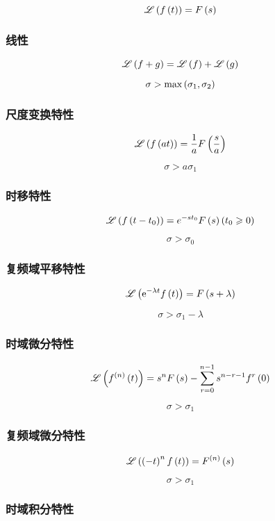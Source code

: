 \documentclass{article}
\begin{document}
\[\mathscr L\left(f\left(t\right)\right)=F\left(s\right)\]

\subsubsection{线性}

\[\mathscr L\left(f+g\right)=\mathscr L\left(f\right)+\mathscr L\left(g\right)\]

\[\sigma>\max\left(\sigma_1,\sigma_2\right)\]

\subsubsection{尺度变换特性}

\[\mathscr L\left(f\left(at\right)\right)=\frac1aF\left(\frac sa\right)\]

\[\sigma>a\sigma_1\]

\subsubsection{时移特性}

\[\mathscr L\left(f\left(t-t_0\right)\right)=e^{-st_0}F\left(s\right)\left(t_0\geqslant0\right)\]

\[\sigma>\sigma_0\]

\subsubsection{复频域平移特性}

\[\mathscr L\left(\mathrm e^{-\lambda t}f\left(t\right)\right)=F\left(s+\lambda\right)\]

\[\sigma>\sigma_1-\lambda\]

\subsubsection{时域微分特性}

\[\mathscr L\left(f^{\left(n\right)}\left(t\right)\right)=s^nF\left(s\right)-\sum_{r=0}^{n-1}s^{n-r-1}f^r\left(0\right)\]

\[\sigma>\sigma_1\]

\subsubsection{复频域微分特性}

\[\mathscr L\left(\left(-t\right)^nf\left(t\right)\right)=F^{\left(n\right)}\left(s\right)\]

\[\sigma>\sigma_1\]

\subsubsection{时域积分特性}
\end{document}

